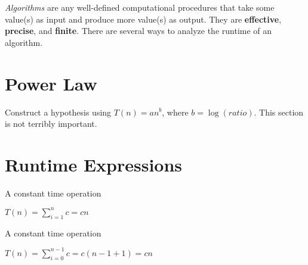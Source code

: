 
\textit{Algorithms} are any well-defined computational procedures that take some value(s) as input and produce more value(s) as output. They are \textbf{effective}, \textbf{precise}, and \textbf{finite}. There are several ways to analyze the runtime of an algorithm.

\section{Power Law}

\noindent Construct a hypothesis using $T(n) = an^{b}$, where $b = \log (ratio)$.
This section is not terribly important.

\section{Runtime Expressions}

\begin{multicols}{2}
  \noindent \hrulefill
  \begin{algorithmic}
     
    \State A constant time operation
    \EndFor
  \end{algorithmic}
  \noindent \hrulefill

  $T(n) = \sum_{i=1}^{n} c = cn$

  \columnbreak

  \noindent \hrulefill
  \begin{algorithmic}
     
    \State A constant time operation
    \EndFor
  \end{algorithmic}
  \noindent \hrulefill

  $T(n) = \sum_{i=0}^{n-1} c = c(n - 1 + 1) = cn$
\end{multicols}

